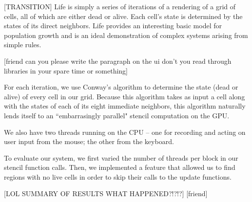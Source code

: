 \documentclass[12pt]{article}
\begin{document}
	[TRANSITION] Life is simply a series of iterations of a rendering of a grid of cells, all of which are either dead or alive. Each cell's state is determined by the states of its direct neighbors. Life provides an interesting basic model for population growth and is an ideal demonstration of complex systems arising from simple rules. 

	[friend can you please write the paragraph on the ui don't you read through libraries in your spare time or something]
	
	For each iteration, we use Conway's algorithm to determine the state (dead or alive) of every cell in our grid. Because this algorithm takes as input a cell along with the states of each of its eight immediate neighbors, this algorithm naturally lends itself to an ``embarrasingly parallel" stencil computation on the GPU.
	
	We also have two threads running on the CPU -- one for recording and acting on user input from the mouse; the other from the keyboard. 
	
	To evaluate our system, we first varied the number of threads per block in our stencil function calls. Then, we implemented a feature that allowed us to find regions with no live cells in order to skip their calls to the update functions. 
	
	[LOL SUMMARY OF RESULTS WHAT HAPPENED?!?!?] [friend]
\end{document}
